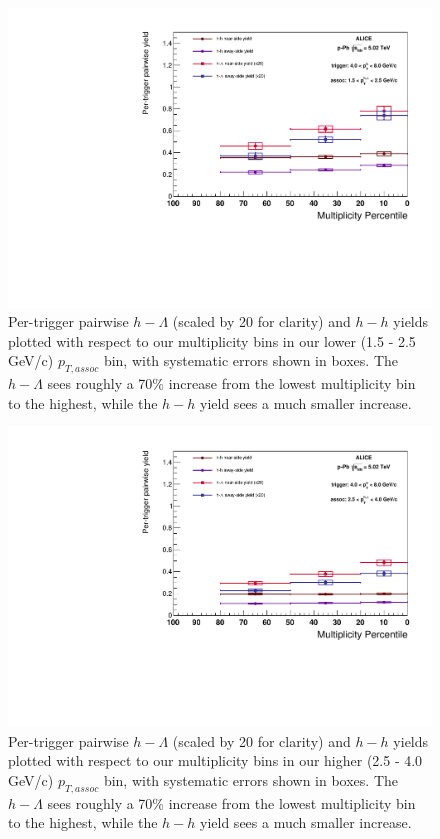 \documentclass[ALICE,manyauthors]{ALICE_analysis_notes}
\begin{document}
\clearpage 

\begin{figure}[ht]
\centering
\includegraphics[width=6in]{figures/pairwise_plot_lowpt.pdf}
\caption{Per-trigger pairwise $h-\Lambda$ (scaled by 20 for clarity) and $h-h$ yields plotted with respect to our multiplicity bins in our lower (1.5 - 2.5 GeV/c) $p_{T, assoc}$ bin, with systematic errors shown in boxes. The $h-\Lambda$ sees roughly a 70\% increase from the lowest multiplicity bin to the highest, while the $h-h$ yield sees a much smaller increase.}
\label{final_pairwise_yields_lowpt}
\end{figure}

\clearpage 

\begin{figure}[ht]
\centering
\includegraphics[width=6in]{figures/pairwise_plot_highpt.pdf}
\caption{Per-trigger pairwise $h-\Lambda$ (scaled by 20 for clarity) and $h-h$ yields plotted with respect to our multiplicity bins in our higher (2.5 - 4.0 GeV/c) $p_{T, assoc}$ bin, with systematic errors shown in boxes. The $h-\Lambda$ sees roughly a 70\% increase from the lowest multiplicity bin to the highest, while the $h-h$ yield sees a much smaller increase.}
\label{final_pairwise_yields_highpt}
\end{figure}
\end{document}
